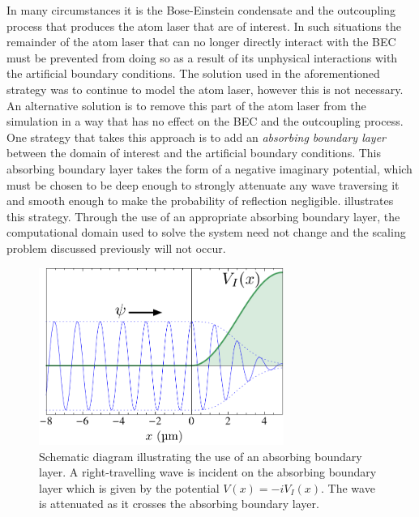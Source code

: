 In many circumstances it is the Bose-Einstein condensate and the outcoupling process that produces the atom laser that are of interest. In such situations the remainder of the atom laser that can no longer directly interact with the BEC must be prevented from doing so as a result of its unphysical interactions with the artificial boundary conditions. The solution used in the aforementioned strategy was to continue to model the atom laser, however this is not necessary. An alternative solution is to remove this part of the atom laser from the simulation in a way that has no effect on the BEC and the outcoupling process. One strategy that takes this approach is to add an \emph{absorbing boundary layer}~\citep{Kosloff:1986,Neuhasuer:1989} between the domain of interest and the artificial boundary conditions. This absorbing boundary layer takes the form of a negative imaginary potential, which must be chosen to be deep enough to strongly attenuate any wave traversing it and smooth enough to make the probability of reflection negligible.  illustrates this strategy. Through the use of an appropriate absorbing boundary layer, the computational domain used to solve the system need not change and the scaling problem discussed previously will not occur.

\begin{figure}
    \centering
    \includegraphics[width=8cm]{AbsorbingBoundarySchematic}
    \caption{
        \label{BackgroundTheory:AbsorbingBoundarySchematic}
        Schematic diagram illustrating the use of an absorbing boundary layer. A right-travelling wave is incident on the absorbing boundary layer which is given by the potential $V(x) = -i V_I(x)$. The wave is attenuated as it crosses the absorbing boundary layer.
    }
\end{figure}

